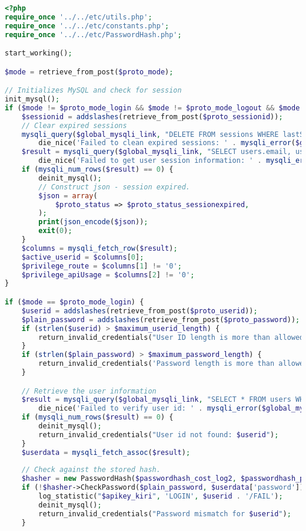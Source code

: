\documentclass[a4paper,twoside]{article}
\begin{document}
\begin{lstlisting}[language=PHP,basicstyle=\tiny,caption=handle.php,label={lst:handle.php}]
<?php
require_once '../../etc/utils.php';
require_once '../../etc/constants.php';
require_once '../../etc/PasswordHash.php';

start_working();

$mode = retrieve_from_post($proto_mode);

// Initializes MySQL and check for session
init_mysql();
if ($mode != $proto_mode_login && $mode != $proto_mode_logout && $mode != $proto_mode_register) {
	$sessionid = addslashes(retrieve_from_post($proto_sessionid));
	// Clear expired sessions
	mysqli_query($global_mysqli_link, "DELETE FROM sessions WHERE lastSeen < (NOW() - INTERVAL $session_expiry_interval_mysql)") or
		die_nice('Failed to clean expired sessions: ' . mysqli_error($global_mysqli_link), true);
	$result = mysqli_query($global_mysqli_link, "SELECT users.email, users.privilegeRoute, users.privilegeApiUsage FROM users LEFT JOIN sessions ON users.email = sessions.email WHERE sessions.sessionId = '$sessionid'") or
		die_nice('Failed to get user session information: ' . mysqli_error($global_mysqli_link), true);
	if (mysqli_num_rows($result) == 0) {
		deinit_mysql();
		// Construct json - session expired.
		$json = array(
			$proto_status => $proto_status_sessionexpired,
		);
		print(json_encode($json));
		exit(0);
	}
	$columns = mysqli_fetch_row($result);
	$active_userid = $columns[0]; 
	$privilege_route = $columns[1] != '0';
	$privilege_apiUsage = $columns[2] != '0';
}

if ($mode == $proto_mode_login) {
	$userid = addslashes(retrieve_from_post($proto_userid));
	$plain_password = addslashes(retrieve_from_post($proto_password));
	if (strlen($userid) > $maximum_userid_length) {
		return_invalid_credentials("User ID length is more than allowed (". strlen($userid) . ')');
	}
	if (strlen($plain_password) > $maximum_password_length) {
		return_invalid_credentials('Password length is more than allowed ('. strlen($password) . ')');
	}

	// Retrieve the user information
	$result = mysqli_query($global_mysqli_link, "SELECT * FROM users WHERE email='$userid'") or
		die_nice('Failed to verify user id: ' . mysqli_error($global_mysqli_link), true);
	if (mysqli_num_rows($result) == 0) {
		deinit_mysql();
		return_invalid_credentials("User id not found: $userid");
	}
	$userdata = mysqli_fetch_assoc($result);
	
	// Check against the stored hash.
	$hasher = new PasswordHash($passwordhash_cost_log2, $passwordhash_portable);
	if (!$hasher->CheckPassword($plain_password, $userdata['password'])) {
		log_statistic("$apikey_kiri", 'LOGIN', $userid . '/FAIL');
		deinit_mysql();
		return_invalid_credentials("Password mismatch for $userid");
	}
	

\end{lstlisting}
\end{document}
